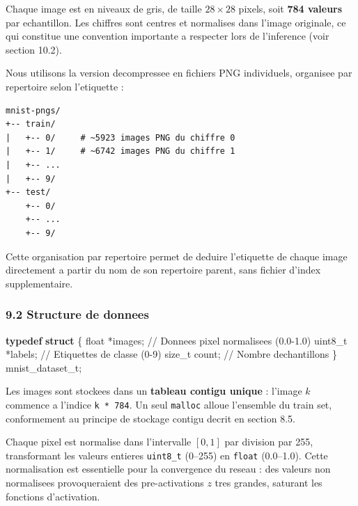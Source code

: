 \documentclass[
  letterpaper,
  DIV=11,
  numbers=noendperiod]{scrartcl}
\newenvironment{Shaded}{\begin{snugshade}}{\end{snugshade}}
\newcommand{\CommentTok}[1]{\textcolor[rgb]{0.37,0.37,0.37}{#1}}
\newcommand{\DataTypeTok}[1]{\textcolor[rgb]{0.68,0.00,0.00}{#1}}
\newcommand{\KeywordTok}[1]{\textcolor[rgb]{0.00,0.23,0.31}{\textbf{#1}}}
\newcommand{\NormalTok}[1]{\textcolor[rgb]{0.00,0.23,0.31}{#1}}
\newcommand{\OperatorTok}[1]{\textcolor[rgb]{0.37,0.37,0.37}{#1}}
\begin{document}
Chaque image est en niveaux de gris, de taille \(28 \times 28\) pixels, soit \textbf{784 valeurs} par echantillon. Les chiffres sont centres et normalises dans l'image originale, ce qui constitue une convention importante a respecter lors de l'inference (voir section 10.2).

Nous utilisons la version decompressee en fichiers PNG individuels, organisee par repertoire selon l'etiquette :

\begin{verbatim}
mnist-pngs/
+-- train/
|   +-- 0/     # ~5923 images PNG du chiffre 0
|   +-- 1/     # ~6742 images PNG du chiffre 1
|   +-- ...
|   +-- 9/
+-- test/
    +-- 0/
    +-- ...
    +-- 9/
\end{verbatim}

Cette organisation par repertoire permet de deduire l'etiquette de chaque image directement a partir du nom de son repertoire parent, sans fichier d'index supplementaire.

\subsubsection{9.2 Structure de donnees}\label{structure-donnees-mnist}

\begin{Shaded}
\begin{Highlighting}[]
\KeywordTok{typedef} \KeywordTok{struct} \OperatorTok{\{}
\NormalTok{    }\DataTypeTok{float}\NormalTok{   }\OperatorTok{*}\NormalTok{images}\OperatorTok{;}      \CommentTok{// Donnees pixel normalisees (0.0-1.0)}
\NormalTok{    uint8\_t }\OperatorTok{*}\NormalTok{labels}\OperatorTok{;}      \CommentTok{// Etiquettes de classe (0-9)}
\NormalTok{    size\_t   count}\OperatorTok{;}       \CommentTok{// Nombre d\textquotesingle{}echantillons}
\OperatorTok{\}}\NormalTok{ mnist\_dataset\_t}\OperatorTok{;}
\end{Highlighting}
\end{Shaded}

Les images sont stockees dans un \textbf{tableau contigu unique} : l'image \(k\) commence a l'indice \texttt{k * 784}. Un seul \texttt{malloc} alloue l'ensemble du train set, conformement au principe de stockage contigu decrit en section 8.5.

Chaque pixel est normalise dans l'intervalle \([0, 1]\) par division par 255, transformant les valeurs entieres \texttt{uint8\_t} (0--255) en \texttt{float} (0.0--1.0). Cette normalisation est essentielle pour la convergence du reseau : des valeurs non normalisees provoqueraient des pre-activations \(z\) tres grandes, saturant les fonctions d'activation.
\end{document}
